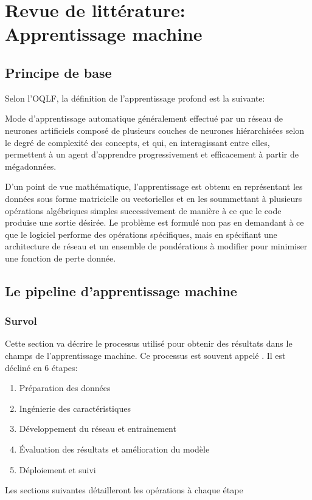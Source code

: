 \section{Revue de littérature: Apprentissage machine}
  \subsection{Principe de base}
    Selon l'\ac{OQLF}\parencite{oqlf_apprentissage_2024}, la définition de l'apprentissage profond est la suivante:
    \begin{definition}
    Mode d'apprentissage automatique généralement effectué par un réseau de neurones artificiels composé de plusieurs couches de neurones hiérarchisées selon le degré de complexité des concepts, et qui, en interagissant entre elles, permettent à un agent d'apprendre progressivement et efficacement à partir de mégadonnées.
    \end{definition}
    D'un point de vue mathématique, l'apprentissage est obtenu en représentant les données sous forme matricielle ou vectorielles et en les soummettant à plusieurs opérations algébriques simples successivement de manière à ce que le code produise une sortie désirée. Le problème est formulé non pas en demandant à ce que le logiciel performe des opérations spécifiques, mais en spécifiant une architecture de réseau et un ensemble de pondérations à modifier pour minimiser une fonction de perte donnée.
  \subsection{Le pipeline d'apprentissage machine}
  \subsubsection{Survol}
      Cette section va décrire le processus utilisé pour obtenir des résultats dans le champs de l'apprentissage machine. Ce processus est souvent appelé  \fg{}. Il est décliné en 6 étapes:
        \begin{enumerate}
          \item Préparation des données
          \item Ingénierie des caractéristiques
          \item Développement du réseau et entrainement
          \item Évaluation des résultats et amélioration du modèle
          \item Déploiement et suivi
        \end{enumerate}
      Les sections suivantes détailleront les opérations à chaque étape
